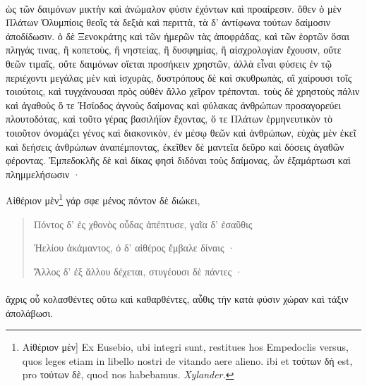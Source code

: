 \documentclass[a4paper, 11pt, oneside, polutonikogreek, german]{article}
\begin{document}
\paragraph{}
ὡς τῶν δαιμόνων μικτὴν καὶ ἀνώμαλον φύσιν ἐχόντων καὶ προαίρεσιν. ὅθεν ὁ μὲν Πλάτων Ὀλυμπίοις θεοῖς τὰ δεξιὰ καὶ περιττὰ, τὰ δ' ἀντίφωνα τούτων δαίμοσιν ἀποδίδωσιν. ὁ δὲ Ξενοκράτης καὶ τῶν ἡμερῶν τὰς ἀποφράδας, καὶ τῶν ἑορτῶν ὅσαι πληγάς τινας, ἢ κοπετοὺς, ἢ νηστείας, ἢ δυσφημίας, ἢ αἰσχρολογίαν ἔχουσιν, οὔτε θεῶν τιμαῖς, οὔτε δαιμόνων οἴεται προσήκειν χρηστῶν, ἀλλὰ εἶναι φύσεις ἐν τῷ περιέχοντι μεγάλας μὲν καὶ ἰσχυρὰς, δυστρόπους δὲ καὶ σκυθρωπὰς, αἳ χαίρουσι τοῖς τοιούτοις, καὶ τυγχάνουσαι πρὸς οὐθὲν ἄλλο χεῖρον τρέπονται. τοὺς δὲ χρηστοὺς πάλιν καὶ ἀγαθοὺς ὅ τε Ἡσίοδος ἁγνοὺς δαίμονας καὶ φύλακας ἀνθρώπων προσαγορεύει πλουτοδότας, καὶ τοῦτο γέρας βασιλήϊον ἔχοντας, ὅ τε Πλάτων ἑρμηνευτικὸν τὸ τοιοῦτον ὀνομάζει γένος καὶ διακονικὸν, ἐν μέσῳ θεῶν καὶ ἀνθρώπων, εὐχὰς μὲν ἐκεῖ καὶ δεήσεις ἀνθρώπων ἀναπέμποντας, ἐκεῖθεν δὲ μαντεῖα δεῦρο καὶ δόσεις ἀγαθῶν φέροντας. Ἐμπεδοκλῆς δὲ καὶ δίκας φησὶ διδόναι τοὺς δαίμονας, ὧν ἐξαμάρτωσι καὶ πλημμελήσωσιν ·

Αἰθέριον μὲν\footnote{Αἰθέριον μὲν] Ex Eusebio, ubi integri sunt, restitues hos Empedoclis versus, quos leges etiam in libello nostri de vitando aere alieno. ibi et τούτων δὴ est, pro τούτων δὲ, quod nos habebamus. \emph{Xylander.}} γάρ σφε μένος πόντον δὲ διώκει,
\begin{quotation}\tiny
Πόντος δ' ἐς χθονὸς οὖδας ἀπέπτυσε, γαῖα δ' ἐσαῦθις

Ἠελίου ἀκάμαντος, ὁ δ' αἰθέρος ἔμβαλε δίναις ·

Ἄλλος δ' ἐξ ἄλλου δέχεται, στυγέουσι δὲ πάντες ·
\end{quotation}
\paragraph{}
ἄχρις οὗ κολασθέντες οὕτω καὶ καθαρθέντες, αὖθις τὴν κατὰ φύσιν χώραν καὶ τάξιν ἀπολάβωσι.
\end{document}

